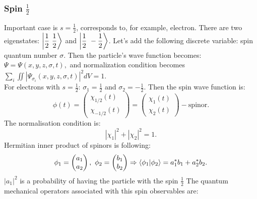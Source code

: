 \documentclass[a4paper, 12pt]{article}
\begin{document}
\subsubsection{Spin $\frac{1}{2}$}
Important case is $s = \frac{1}{2}$, corresponds to, for example,  electron. There are two eigenstates: $\displaystyle{\ket{\frac{1}{2} ~ \frac{1}{2}}}$ and $\displaystyle{\ket{\frac{1}{2} ~ -\frac{1}{2}}}
$. %
Let's add the following discrete variable: spin quantum number $\sigma.$ Then the particle's wave function becomes:
$\Psi = \Psi(x,y,z, \sigma, t), $ and normalization condition becomes $\displaystyle{\sum_i \iint |\Psi_{\sigma_i} (x,y,z, \sigma, t)|^2dV=1}.$ \\
For electrons with $s = \frac{1}{2}$: $\sigma_1 = \frac{1}{2}$ and $\sigma_2 = -\frac{1}{2}$. Then  the spin wave function is:
$$\displaystyle{\phi(t) = 
\begin{pmatrix}
	\chi_{1/2}(t) \\
	\chi_{-1/2}(t)
\end{pmatrix} = 
\begin{pmatrix}
	\chi_1 (t) \\
	\chi_2(t)
\end{pmatrix}} - \text{spinor}.$$
The normalisation condition is:
$$|\chi_1| ^2 + |\chi_2|^2 =1.$$
Hermitian inner product of spinors is following:
$$\phi_1 = \begin{pmatrix}
	a_1 \\
	a_2
\end{pmatrix}, ~ \phi_2 = \begin{pmatrix}
	b_1 \\
	b_2
\end{pmatrix} \Rightarrow \bra{\phi_1}\ket{\phi_2} = a_1^* b_1 + a_2^* b_2.$$
$|a_1|^2$ is a probability of having the particle with the spin  $\frac{1}{2}$
The quantum mechanical operators associated with this spin observables are:
\end{document}
